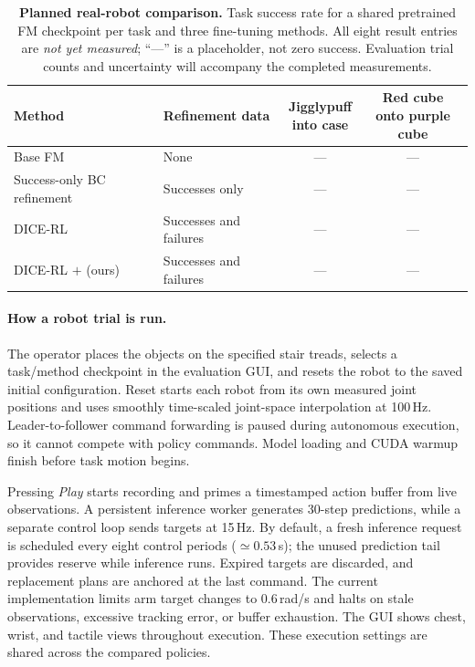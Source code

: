 \begin{table}[t]
  \centering
  \caption{\textbf{Planned real-robot comparison.} Task success rate for a
  shared pretrained FM checkpoint per task and three fine-tuning methods.
  All eight result entries are \emph{not yet measured}; ``---'' is a placeholder,
  not zero success. Evaluation trial counts and uncertainty will accompany
  the completed measurements.}
  \label{tab:real-robot}
  \small
  \setlength{\tabcolsep}{5pt}
  \begin{tabular}{llcc}
    \toprule
    Method & Refinement data & \makecell{Jigglypuff\\into case} &
      \makecell{Red cube\\onto purple cube} \\
    \midrule
    Base FM & None & --- & --- \\
    Success-only BC refinement & Successes only & --- & --- \\
    DICE-RL & Successes and failures & --- & --- \\
    DICE-RL $+$ \method{} (ours) & Successes and failures & --- & --- \\
    \bottomrule
  \end{tabular}
\end{table}

\paragraph{How a robot trial is run.}
The operator places the objects on the specified stair treads, selects a
task/method checkpoint in the evaluation GUI, and resets the robot to the
saved initial configuration. Reset starts each robot from its own measured
joint positions and uses smoothly time-scaled joint-space interpolation at
100\,Hz. Leader-to-follower command forwarding is paused during autonomous
execution, so it cannot compete with policy commands. Model loading and CUDA
warmup finish before task motion begins.

Pressing \emph{Play} starts recording and primes a timestamped action buffer
from live observations. A persistent inference worker generates 30-step
predictions, while a separate control loop sends targets at 15\,Hz. By
default, a fresh inference request is scheduled every eight control periods
($\simeq0.53$\,s); the unused prediction tail provides reserve while inference
runs. Expired targets are discarded, and replacement plans are anchored at
the last command. The current implementation limits arm target changes to
0.6\,rad/s and halts on stale observations, excessive tracking error, or buffer
exhaustion. The GUI shows chest, wrist, and tactile views throughout execution.
These execution settings are shared across the compared policies.

